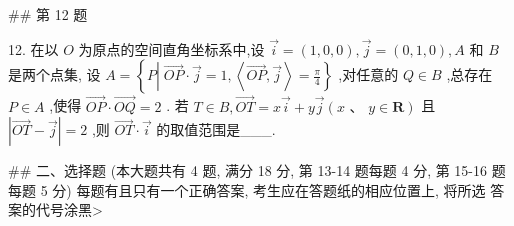 \documentclass[11pt,a4paper]{article}
\begin{document}
## 第 12 题


12. 在以 $O$ 为原点的空间直角坐标系中,设 $\overrightarrow{i} = \left( {1,0,0}\right) ,\overrightarrow{j} = \left( {0,1,0}\right) , A$ 和 $B$ 是两个点集, 设 $A = \left\{  {P\left| {\;\overrightarrow{OP} \cdot  \overrightarrow{j} = 1}\right. ,\left\langle  {\overrightarrow{OP},\overrightarrow{j}}\right\rangle   = \frac{\pi }{4}}\right\}$ ,对任意的 $Q \in  B$ ,总存在 $P \in  A$ ,使得 $\overrightarrow{OP} \cdot  \overrightarrow{OQ} = 2$ . 若 $T \in  B,\overrightarrow{OT} = x\overrightarrow{i} + y\overrightarrow{j}\left( {x\text{ 、 }y \in  \mathbf{R}}\right)$ 且 $\left| {\overrightarrow{OT} - \overrightarrow{j}}\right|  = 2$ ,则 $\overrightarrow{OT} \cdot  \overrightarrow{i}$ 的取值范围是___.

## 二、选择题 (本大题共有 4 题, 满分 18 分, 第 13-14 题每题 4 分, 第 15-16 题 每题 5 分) 每题有且只有一个正确答案, 考生应在答题纸的相应位置上, 将所选 答案的代号涂黑>
\end{document}
